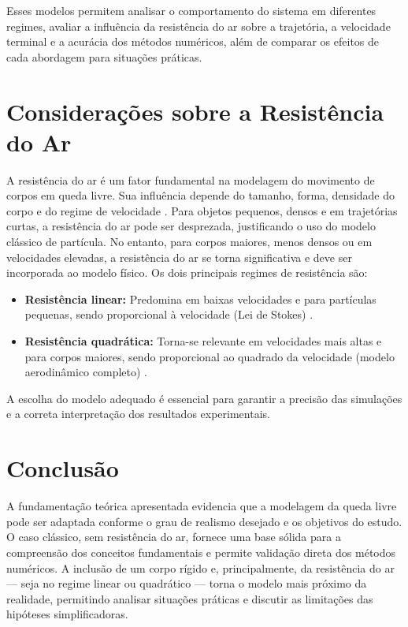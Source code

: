 Esses modelos permitem analisar o comportamento do sistema em diferentes regimes, avaliar a influência da resistência do ar sobre a trajetória, a velocidade terminal e a acurácia dos métodos numéricos, além de comparar os efeitos de cada abordagem para situações práticas.

\section{Considerações sobre a Resistência do Ar}


A resistência do ar é um fator fundamental na modelagem do movimento de corpos em queda livre. Sua influência depende do tamanho, forma, densidade do corpo e do regime de velocidade \cite{halliday2011,batchelor2000}. Para objetos pequenos, densos e em trajetórias curtas, a resistência do ar pode ser desprezada, justificando o uso do modelo clássico de partícula. No entanto, para corpos maiores, menos densos ou em velocidades elevadas, a resistência do ar se torna significativa e deve ser incorporada ao modelo físico. Os dois principais regimes de resistência são:

\begin{itemize}
    \item \textbf{Resistência linear:} Predomina em baixas velocidades e para partículas pequenas, sendo proporcional à velocidade (Lei de Stokes) \cite{batchelor2000}.
    \item \textbf{Resistência quadrática:} Torna-se relevante em velocidades mais altas e para corpos maiores, sendo proporcional ao quadrado da velocidade (modelo aerodinâmico completo) \cite{batchelor2000,butcher2016}.
\end{itemize}

A escolha do modelo adequado é essencial para garantir a precisão das simulações e a correta interpretação dos resultados experimentais.

\section{Conclusão}

A fundamentação teórica apresentada evidencia que a modelagem da queda livre pode ser adaptada conforme o grau de realismo desejado e os objetivos do estudo. O caso clássico, sem resistência do ar, fornece uma base sólida para a compreensão dos conceitos fundamentais e permite validação direta dos métodos numéricos. A inclusão de um corpo rígido e, principalmente, da resistência do ar — seja no regime linear ou quadrático — torna o modelo mais próximo da realidade, permitindo analisar situações práticas e discutir as limitações das hipóteses simplificadoras.

